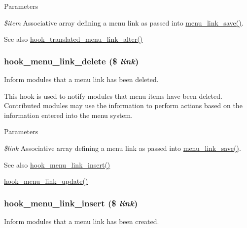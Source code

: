 \begin{DoxyParams}{Parameters}
\item[{\em \$item}]Associative array defining a menu link as passed into \hyperlink{group__menu_ga133b177fee00b678a19afba18fb81ebc}{menu\_\-link\_\-save()}.\end{DoxyParams}
\begin{DoxySeeAlso}{See also}
\hyperlink{group__hooks_ga5b5395b90c4987e29c6f6430fc066e8c}{hook\_\-translated\_\-menu\_\-link\_\-alter()} 
\end{DoxySeeAlso}
\hypertarget{group__hooks_gaf08037b21bd31aa8d2b12e988da7e2fb}{
\subsubsection[{hook\_\-menu\_\-link\_\-delete}]{\setlength{\rightskip}{0pt plus 5cm}hook\_\-menu\_\-link\_\-delete (\$ {\em link})}}
\label{group__hooks_gaf08037b21bd31aa8d2b12e988da7e2fb}
Inform modules that a menu link has been deleted.

This hook is used to notify modules that menu items have been deleted. Contributed modules may use the information to perform actions based on the information entered into the menu system.


\begin{DoxyParams}{Parameters}
\item[{\em \$link}]Associative array defining a menu link as passed into \hyperlink{group__menu_ga133b177fee00b678a19afba18fb81ebc}{menu\_\-link\_\-save()}.\end{DoxyParams}
\begin{DoxySeeAlso}{See also}
\hyperlink{group__hooks_ga834a576b88ca7a08ce1244469fabb116}{hook\_\-menu\_\-link\_\-insert()} 

\hyperlink{group__hooks_gafd2d5cc2a49cf37a637201eb76a41d1d}{hook\_\-menu\_\-link\_\-update()} 
\end{DoxySeeAlso}
\hypertarget{group__hooks_ga834a576b88ca7a08ce1244469fabb116}{
\subsubsection[{hook\_\-menu\_\-link\_\-insert}]{\setlength{\rightskip}{0pt plus 5cm}hook\_\-menu\_\-link\_\-insert (\$ {\em link})}}
\label{group__hooks_ga834a576b88ca7a08ce1244469fabb116}
Inform modules that a menu link has been created.

